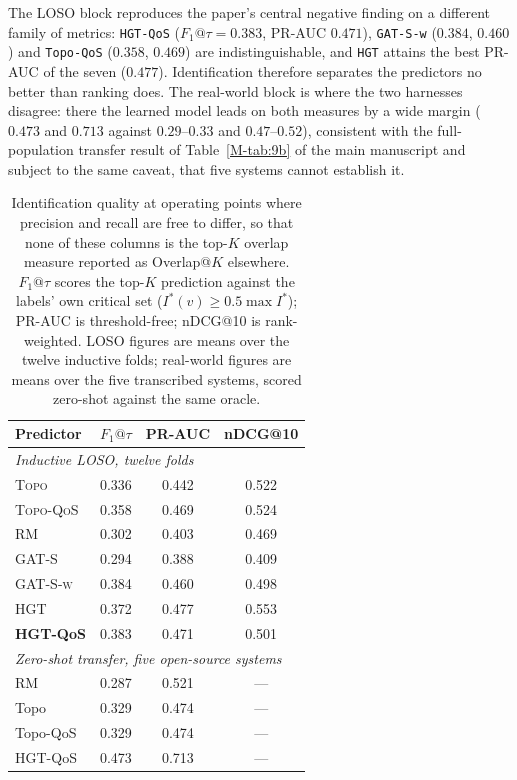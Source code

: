 \documentclass[preprint,3p]{elsarticle}
\begin{document}
The LOSO block reproduces the paper's central negative finding on a different
family of metrics: \texttt{HGT-QoS} ($F_1@\tau = 0.383$, PR-AUC $0.471$),
\texttt{GAT-S-w} ($0.384$, $0.460$) and \texttt{Topo-QoS} ($0.358$, $0.469$)
are indistinguishable, and \texttt{HGT} attains the best PR-AUC of the seven
($0.477$). Identification therefore separates the predictors no better than
ranking does. The real-world block is where the two harnesses disagree: there
the learned model leads on both measures by a wide margin ($0.473$ and $0.713$
against $0.29$--$0.33$ and $0.47$--$0.52$), consistent with the full-population
transfer result of Table~\ref{M-tab:9b} of the main manuscript and subject to the same
caveat, that five systems cannot establish it.

\begin{table}[htbp]
\centering
\small
\centering
\caption{Identification quality at operating points where precision and recall are free to differ, so that none of these columns is the top-$K$ overlap measure reported as Overlap@$K$ elsewhere. $F_1@\tau$ scores the top-$K$ prediction against the labels' own critical set ($I^*(v) \ge 0.5\max I^*$); PR-AUC is threshold-free; nDCG@10 is rank-weighted. LOSO figures are means over the twelve inductive folds; real-world figures are means over the five transcribed systems, scored zero-shot against the same oracle.}
\label{tab:identification}
\begin{tabular}{lccc}
\toprule
Predictor & $F_1@\tau$ & PR-AUC & nDCG@10 \\
\midrule
\multicolumn{4}{l}{\textit{Inductive LOSO, twelve folds}} \\
\textsc{Topo} & 0.336 & 0.442 & 0.522 \\
\textsc{Topo-QoS} & 0.358 & 0.469 & 0.524 \\
\textsc{RM} & 0.302 & 0.403 & 0.469 \\
\textsc{GAT-S} & 0.294 & 0.388 & 0.409 \\
\textsc{GAT-S-w} & 0.384 & 0.460 & 0.498 \\
\textsc{HGT} & 0.372 & 0.477 & 0.553 \\
\textbf{HGT-QoS} & 0.383 & 0.471 & 0.501 \\
\midrule
\multicolumn{4}{l}{\textit{Zero-shot transfer, five open-source systems}} \\
RM & 0.287 & 0.521 & — \\
Topo & 0.329 & 0.474 & — \\
Topo-QoS & 0.329 & 0.474 & — \\
HGT-QoS & 0.473 & 0.713 & — \\
\bottomrule
\end{tabular}
\end{table}
\end{document}
